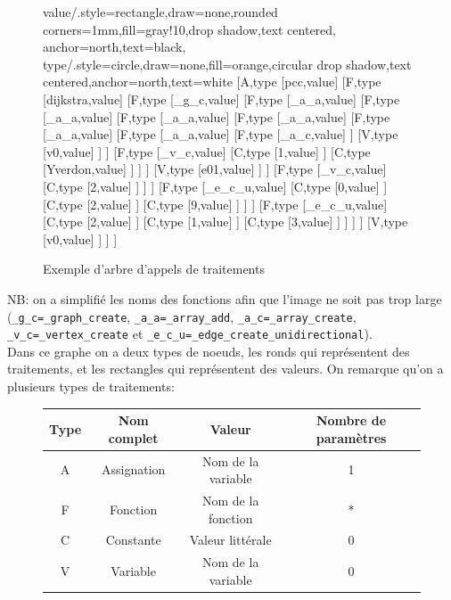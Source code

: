 \documentclass[french]{article}
\begin{document}
		\begin{figure}[H]
			\centering
			\begin{forest}
				value/.style={rectangle,draw=none,rounded corners=1mm,fill=gray!10,drop shadow,text centered, anchor=north,text=black}, 
				type/.style={circle,draw=none,fill=orange,circular drop shadow,text centered,anchor=north,text=white}
				[{A},type
				[{pcc},value] 
				[{F},type
				[{dijkstra},value]
				[{F},type
				[{\_g\_c},value]
				[{F},type
				[{\_a\_a},value]
				[{F},type
				[{\_a\_a},value]
				[{F},type
				[{\_a\_a},value]
				[{F},type
				[{\_a\_a},value]
				[{F},type
				[{\_a\_a},value]
				[{F},type
				[{\_a\_a},value]
				[{F},type
				[{\_a\_c},value]
				]
				[{V},type
				[{v0},value]
				]
				]
				[{F},type
				[{\_v\_c},value]
				[{C},type
				[{1},value]
				]
				[{C},type
				[{Yverdon},value]
				]
				]
				]
				[{V},type
				[{e01},value]
				]
				]
				[{F},type
				[{\_v\_c},value]
				[{C},type
				[{2},value]
				]
				]
				]
				[{F},type
				[{\_e\_c\_u},value]
				[{C},type
				[{0},value]
				]
				[{C},type
				[{2},value]
				]
				[{C},type
				[{9},value]
				]
				]
				]
				[{F},type
				[{\_e\_c\_u},value]
				[{C},type
				[{2},value]
				]
				[{C},type
				[{1},value]
				]
				[{C},type
				[{3},value]
				]
				]
				]
				]
				[{V},type
				[{v0},value]
				]
				]
				]	
			\end{forest}
			\caption{Exemple d'arbre d'appels de traitements}
		\end{figure}
		
		NB: on a simplifié les noms des fonctions afin que l'image ne soit pas trop large (\texttt{\_g\_c=\_graph\_create}, \texttt{\_a\_a=\_array\_add}, \texttt{\_a\_c=\_array\_create}, \texttt{\_v\_c=\_vertex\_create} et \texttt{\_e\_c\_u=\_edge\_create\_unidirectional}).\\
		
		Dans ce graphe on a deux types de noeuds, les ronds qui représentent des traitements, et les rectangles qui représentent des valeurs. On remarque qu'on a plusieurs types de traitements:
		
		\begin{figure}[H]
			\centering
			\begin{tabular}{cccc}
				Type & Nom complet & Valeur & Nombre de paramètres\\
				\hline
				A & Assignation & Nom de la variable & 1\\
				F & Fonction & Nom de la fonction & *\\
				C & Constante & Valeur littérale & 0\\
				V & Variable & Nom de la variable & 0\\
			\end{tabular}
		\end{figure}
		
\end{document}
